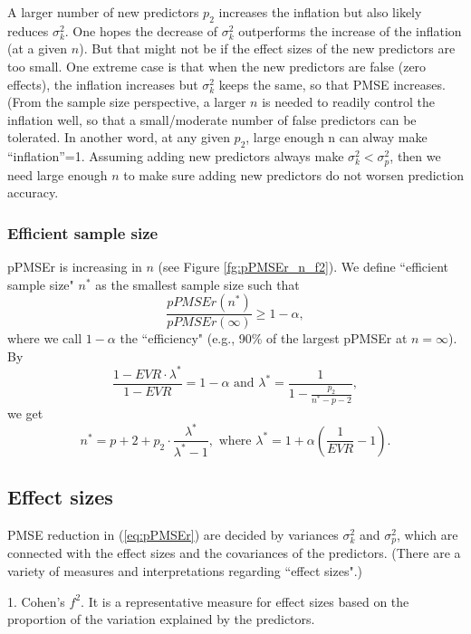 \documentclass[11pt]{article}
\begin{document}
A larger number of new predictors $p_2$ %
increases the inflation but also likely reduces $\sigma_k^2$. One hopes the decrease of $\sigma_k^2$ outperforms the increase of the inflation (at a given $n$). But that might not be if the effect sizes of the new predictors are too small. One extreme case is that when the new predictors are false (zero effects), the inflation increases but $\sigma_k^2$ keeps the same, so that PMSE increases. (From the sample size perspective, a larger $n$ is needed to readily control the inflation well, so that a small/moderate number of false predictors can be tolerated. In another word, at any given $p_2$, large enough n can alway make “inflation”=1. Assuming adding new predictors always make $\sigma_k^2 < \sigma_p^2$, then we need large enough $n$ to make sure adding new predictors do not worsen prediction accuracy. 


\subsubsection{Efficient sample size}

pPMSEr is increasing in $n$ (see Figure \ref{fg:pPMSEr_n_f2}). We define ``efficient sample size" $n^*$ as the smallest sample size such that 
$$
\frac{pPMSEr(n^*)}{pPMSEr(\infty)} \geq 1-\alpha, 
$$
where we call $1-\alpha$ the ``efficiency" (e.g., 90\% of the largest pPMSEr at $n=\infty$). 
By 
$$
\frac{1 - EVR\cdot \lambda^*}{1 - EVR} = 1- \alpha 
\text{ and } 
\lambda^*=\frac{1}{1 - \frac{p_2}{n^*-p-2}},
$$
we get 
\begin{equation}
\label{eq:effi.n}
n^* = p+2 + p_2 \cdot \frac{\lambda^*}{\lambda^*-1}, \text{ where } 
\lambda^*= 1+ \alpha(\frac{1}{EVR} - 1 ). 
\end{equation}


\subsection{Effect sizes}

PMSE reduction in (\ref{eq:pPMSEr}) are decided by variances $\sigma_k^2$ and $\sigma_p^2$, which are connected with the effect sizes and the covariances of the predictors.  (There are a variety of measures and interpretations regarding ``effect sizes".)

1. Cohen's $f^2$. It is a representative measure for effect sizes based on the proportion of the variation explained by the predictors.
\end{document}
